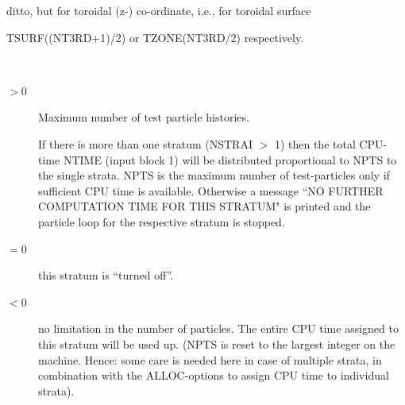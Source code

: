 \begin{description}
        ditto, but for toroidal (z-) co-ordinate,
        i.e., for toroidal surface

        TSURF((NT3RD+1)/2) or TZONE(NT3RD/2) respectively.
  \item[NPTS] ~ 

        \begin{description}
          \item[$> 0$] Maximum number of test particle histories.

                If there is more than one stratum (NSTRAI $>$  1) then the total CPU-time NTIME
                (input block 1) will be distributed proportional to NPTS to the single strata.
                NPTS is the maximum number of test-particles only if sufficient CPU time is
                available.
                Otherwise a message ``NO FURTHER COMPUTATION TIME FOR THIS STRATUM" is printed
                and the particle loop for the respective stratum is stopped.
          \item[$= 0$] this stratum is ``turned off''.

          \item[$< 0$] no limitation in the number of particles.
                The entire CPU time assigned to this stratum will be used up.
                (NPTS is reset to the largest integer on the machine.
                Hence: some care is needed here in case of multiple strata, in combination with
                the ALLOC-options to assign CPU time to individual strata).
        \end{description}

  \item[NINITL] ~ 


\end{description}
